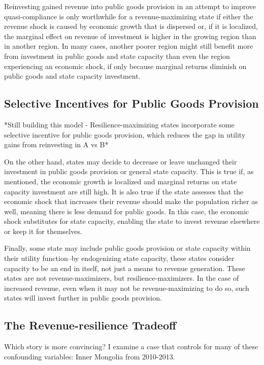\documentclass[bibtex,nonblind]{apsr_submission}
\begin{document}
Reinvesting gained revenue into public goods provision in an attempt to improve quasi-compliance is only worthwhile for a revenue-maximizing state if either the revenue shock is caused by economic growth that is dispersed or, if it is localized, the marginal effect on revenue of investment is higher in the growing region than in another region. In many cases, another poorer region might still benefit more from investment in public goods and state capacity than even the region experiencing an economic shock, if only because marginal returns diminish on public goods and state capacity investment.

\subsection{Selective Incentives for Public Goods Provision}

*Still building this model - Resilience-maximizing states incorporate some selective incentive for public goods provision, which reduces the gap in utility gains from reinvesting in A vs B*

On the other hand, states may decide to decrease or leave unchanged their investment in public goods provision or general state capacity. This is true if, as mentioned, the economic growth is localized and marginal returns on state capacity investment are still high. It is also true if the state assesses that the economic shock that increases their revenue should make the population richer as well, meaning there is less demand for public goods. In this case, the economic shock substitutes for state capacity, enabling the state to invest revenue elsewhere or keep it for themselves.

Finally, some state may include public goods provision or state capacity within their utility function--by endogenizing state capacity, these states consider capacity to be an end in itself, not just a means to revenue generation. These states are not revenue-maximizers, but resilience-maximizers. In the case of increased revenue, even when it may not be revenue-maximizing to do so, such states will invest further in public goods provision.

\subsection{The Revenue-resilience Tradeoff}

Which story is more convincing? I examine a case that controls for many of these confounding variables: Inner Mongolia from 2010-2013.
\end{document}
